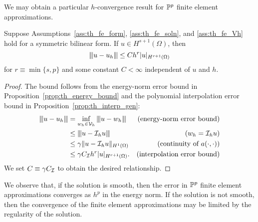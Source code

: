 We may obtain a particular $h$-convergence result for $\mathbb{P}^p$ finite element approximations.
\begin{proposition}
  \label{prop:th_energy_bound_poly}
  Suppose Assumptions~\ref{ass:th_fe_form}, \ref{ass:th_fe_soln}, and \ref{ass:th_fe_Vh} hold for a symmetric bilinear form. If $u \in H^{s+1}(\Omega)$, then
  \begin{equation*}
    |\kern-1pt|\kern-1pt| u - u_h |\kern-1pt|\kern-1pt| \leq C h^r | u |_{H^{r+1}(\Omega)}
  \end{equation*}
  for $r \equiv \min\{s,p\}$ and some constant $C < \infty$ independent of $u$ and $h$.
  \begin{proof}
    The bound follows from the energy-norm error bound in Proposition~\eqref{prop:th_energy_bound} and the polynomial interpolation error bound in Proposition~\ref{prop:th_interp_gen}:
    \begin{align*}
      |\kern-1pt|\kern-1pt|  u - u_h  |\kern-1pt|\kern-1pt| &= \inf_{w_h \in \mathcal{V}_h} |\kern-1pt|\kern-1pt|  u - w_h  |\kern-1pt|\kern-1pt|
      & \text{(energy-norm error bound)}  \\
      &\leq |\kern-1pt|\kern-1pt|  u - \mathcal{I}_h u  |\kern-1pt|\kern-1pt| &\text{($w_h = \mathcal{I}_h u$)} \\
      &\leq \gamma \| u - \mathcal{I}_h u \|_{H^1(\Omega)} &\text{(continuity of $a(\cdot,\cdot)$)} \\
      &\leq \gamma C_{\mathcal{I}} h^r | u |_{H^{r+1}(\Omega)}. &\text{(interpolation error bound)}
    \end{align*}
    We set $C \equiv \gamma C_{\mathcal{I}}$ to obtain the desired relationship.
  \end{proof}
\end{proposition}

We observe that, if the solution is smooth, then the error in $\mathbb{P}^p$ finite element approximations converges as $h^p$ in the energy norm.  If the solution is not smooth, then the convergence of the finite element approximations may be limited by the regularity of the solution. 

